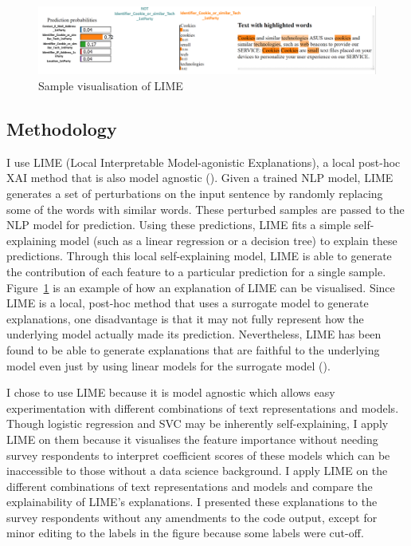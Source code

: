 \begin{figure}[!ht]
	\centering
	\includegraphics[width=1\linewidth]{figures/explanations_visualisations/section_4a/Picture1.png}
	\caption{Sample visualisation of LIME}   
    \label{fig:lime_sample}
\end{figure}

\subsection{Methodology}
I use LIME (Local Interpretable Model-agonistic Explanations), a local post-hoc XAI method that is also model agnostic (\cite{lime}). Given a trained NLP model, LIME generates a set of perturbations on the input sentence by randomly replacing some of the words with similar words. These perturbed samples are passed to the NLP model for prediction. Using these predictions, LIME fits a simple self-explaining model (such as a linear regression or a decision tree) to explain these predictions. Through this local self-explaining model, LIME is able to generate the contribution of each feature to a particular prediction for a single sample. Figure~\ref{fig:lime_sample} is an example of how an explanation of LIME can be visualised. Since LIME is a local, post-hoc method that uses a surrogate model to generate explanations, one disadvantage is that it may not fully represent how the underlying model actually made its prediction. Nevertheless, LIME has been found to be able to generate explanations that are faithful to the underlying model even just by using linear models for the surrogate model (\cite{lime}).

I chose to use LIME because it is model agnostic which allows easy experimentation with different combinations of text representations and models. Though logistic regression and SVC may be inherently self-explaining, I apply LIME on them because it visualises the feature importance without needing survey respondents to interpret coefficient scores of these models which can be inaccessible to those without a data science background. I apply LIME on the different combinations of text representations and models and compare the explainability of LIME's explanations. I presented these explanations to the survey respondents without any amendments to the code output, except for minor editing to the labels in the figure because some labels were cut-off.

